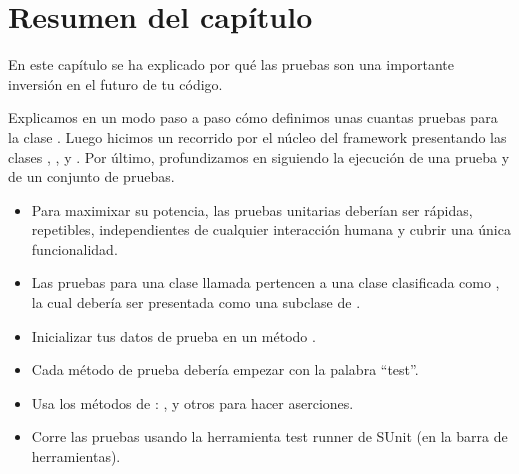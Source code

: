 \documentclass[a4paper,10pt,twoside]{book}
\begin{document}



\section{Resumen del cap\'itulo}

En este cap\'itulo se ha explicado por qu\'e las pruebas son una importante inversi\'on
en el futuro de tu c\'odigo.

Explicamos en un modo paso a paso c\'omo definimos unas cuantas pruebas para la clase .
Luego hicimos un recorrido por el n\'ucleo del framework \sunit presentando
las clases  , ,  y . Por \'ultimo, profundizamos en \sunit siguiendo la ejecuci\'on de una prueba y de un conjunto de pruebas.

\begin{itemize}
  \item Para maximixar su potencia, las pruebas unitarias deber\'ian ser r\'apidas, repetibles, independientes de cualquier interacci\'on humana y cubrir una \'unica funcionalidad.

  \item Las pruebas para una clase llamada  pertencen a una clase clasificada como , la cual deber\'ia ser presentada como una subclase de .
  \item Inicializar tus datos de prueba en un m\'etodo .
  \item Cada m\'etodo de prueba deber\'ia empezar con la palabra ``test''.
  \item Usa los m\'etodos de  :  ,  y otros para hacer aserciones.
  \item Corre las pruebas usando la herramienta test runner de SUnit (en la barra de herramientas).
\end{itemize}

\ifx\wholebook\relax\else
   
   
\end{document}
